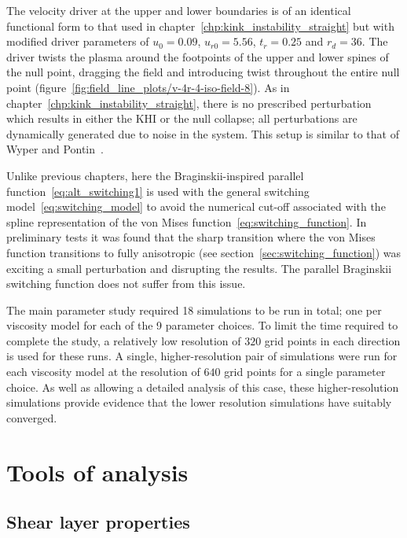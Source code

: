 The velocity driver at the upper and lower boundaries is of an identical functional form to that used in chapter~\ref{chp:kink_instability_straight} but with modified driver parameters of $u_0 = 0.09$, $u_{r0} = 5.56$, $t_r = 0.25$ and $r_d = 36$. The driver twists the plasma around the footpoints of the upper and lower spines of the null point, dragging the field and introducing twist throughout the entire null point (figure~\ref{fig:field_line_plots/v-4r-4-iso-field-8}). As in chapter~\ref{chp:kink_instability_straight}, there is no prescribed perturbation which results in either the KHI or the null collapse; all perturbations are dynamically generated due to noise in the system. This setup is similar to that of Wyper and Pontin~\cite{wyperKelvinHelmholtzInstabilityCurrentvortex2013}. 

Unlike previous chapters, here the Braginskii-inspired parallel function~\eqref{eq:alt_switching1} is used with the general switching model~\eqref{eq:switching_model} to avoid the numerical cut-off associated with the spline representation of the von Mises function~\eqref{eq:switching_function}. In preliminary tests it was found that the sharp transition where the von Mises function transitions to fully anisotropic (see section~\ref{sec:switching_function}) was exciting a small perturbation and disrupting the results. The parallel Braginskii switching function does not suffer from this issue.

The main parameter study required 18 simulations to be run in total; one per viscosity model for each of the 9 parameter choices. To limit the time required to complete the study, a relatively low resolution of $320$ grid points in each direction is used for these runs. A single, higher-resolution pair of simulations were run for each viscosity model at the resolution of $640$ grid points for a single parameter choice. As well as allowing a detailed analysis of this case, these higher-resolution simulations provide evidence that the lower resolution simulations have suitably converged.

\section{Tools of analysis}

\label{sec:khi_analysis}

\subsection{Shear layer properties}

